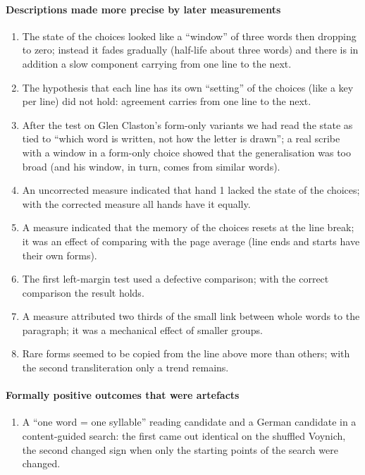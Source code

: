 \paragraph{Descriptions made more precise by later measurements}
\begin{enumerate}[resume]
\item The state of the choices looked like a ``window'' of three words then dropping to zero; instead it fades gradually
  (half-life about three words) and there is in addition a slow component carrying from one line to the next.
\item The hypothesis that each line has its own ``setting'' of the choices (like a key per line) did not hold: agreement
  carries from one line to the next.
\item After the test on Glen Claston's form-only variants we had read the state as tied to ``which word is written, not
  how the letter is drawn''; a real scribe with a window in a form-only choice showed that the generalisation was too broad
  (and his window, in turn, comes from similar words).
\item An uncorrected measure indicated that hand 1 lacked the state of the choices; with the corrected measure all hands
  have it equally.
\item A measure indicated that the memory of the choices resets at the line break; it was an effect of comparing with the
  page average (line ends and starts have their own forms).
\item The first left-margin test used a defective comparison; with the correct comparison the result holds.
\item A measure attributed two thirds of the small link between whole words to the paragraph; it was a mechanical effect
  of smaller groups.
\item Rare forms seemed to be copied from the line above more than others; with the second transliteration only a trend
  remains.
\end{enumerate}

\paragraph{Formally positive outcomes that were artefacts}
\begin{enumerate}[resume]
\item A ``one word = one syllable'' reading candidate and a German candidate in a content-guided search: the first came out
  identical on the shuffled Voynich, the second changed sign when only the starting points of the search were changed.
\end{enumerate}

